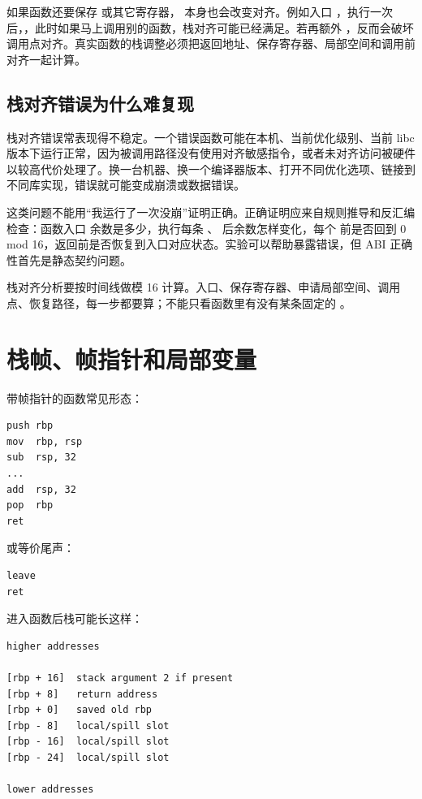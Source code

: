如果函数还要保存  或其它寄存器， 本身也会改变对齐。例如入口 ，执行一次  后，，此时如果马上调用别的函数，栈对齐可能已经满足。若再额外 ，反而会破坏调用点对齐。真实函数的栈调整必须把返回地址、保存寄存器、局部空间和调用前对齐一起计算。

\subsection{栈对齐错误为什么难复现}

栈对齐错误常表现得不稳定。一个错误函数可能在本机、当前优化级别、当前 libc 版本下运行正常，因为被调用路径没有使用对齐敏感指令，或者未对齐访问被硬件以较高代价处理了。换一台机器、换一个编译器版本、打开不同优化选项、链接到不同库实现，错误就可能变成崩溃或数据错误。

这类问题不能用“我运行了一次没崩”证明正确。正确证明应来自规则推导和反汇编检查：函数入口  余数是多少，执行每条 、 后余数怎样变化，每个  前是否回到 0 mod 16，返回前是否恢复到入口对应状态。实验可以帮助暴露错误，但 ABI 正确性首先是静态契约问题。

\begin{keyidea}
栈对齐分析要按时间线做模 16 计算。入口、保存寄存器、申请局部空间、调用点、恢复路径，每一步都要算；不能只看函数里有没有某条固定的 。
\end{keyidea}

\section{栈帧、帧指针和局部变量}

带帧指针的函数常见形态：

\begin{lstlisting}
push rbp
mov  rbp, rsp
sub  rsp, 32
...
add  rsp, 32
pop  rbp
ret
\end{lstlisting}

或等价尾声：

\begin{lstlisting}
leave
ret
\end{lstlisting}

进入函数后栈可能长这样：

\begin{lstlisting}
higher addresses

[rbp + 16]  stack argument 2 if present
[rbp + 8]   return address
[rbp + 0]   saved old rbp
[rbp - 8]   local/spill slot
[rbp - 16]  local/spill slot
[rbp - 24]  local/spill slot

lower addresses
\end{lstlisting}

